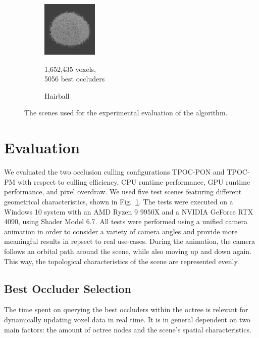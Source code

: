 \documentclass[conference]{IEEEtran}
\begin{document}
\begin{figure}
\begin{subfigure}{100px}
    \end{subfigure}
    \begin{subfigure}{100px}
        \includegraphics[width=100px]{images/model-hairball.jpg}
        \caption{Hairball \cite{b8}}
        \parbox{\linewidth}{\centering\footnotesize 1,652,435 voxels,\\ 5056 best occluders}
    \end{subfigure}
    
    \caption{The scenes used for the experimental evaluation of the algorithm.}
    \label{fig:models}
\end{figure}

\section{Evaluation} \label{sec-evaluation}

\noindent
We evaluated the two occlusion culling configurations \ac{TPOC-PON} and \ac{TPOC-PM} with respect to culling 
efficiency, \ac{CPU} runtime performance, \ac{GPU} runtime performance, and pixel overdraw. We used five 
test scenes featuring different geometrical characteristics, shown in Fig.~\ref{fig:models}. The tests were 
executed on a Windows 10 system with an AMD Ryzen 9 9950X and a NVIDIA GeForce RTX 4090, using Shader Model 
6.7. All tests were performed using a unified camera animation in order to consider a variety of camera angles 
and provide more meaningful results in repsect to real use-cases. During the animation, the camera follows an 
orbital path around the scene, while also moving up and down again. This way, the topological characteristics 
of the scene are represented evenly. %


\subsection{Best Occluder Selection} \label{subsec-best-occluder-selection}

\noindent
The time spent on querying the best occluders within the octree is relevant for dynamically updating 
voxel data in real time. It is in general dependent on two main factors: the amount of octree nodes 
and the scene's spatial characteristics. \\
\end{document}
